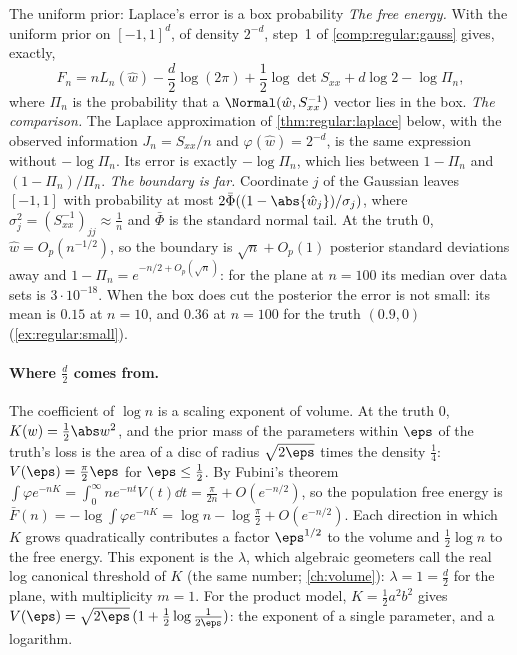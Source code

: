\begin{refsection}
\begin{computation}{The uniform prior: Laplace's error is a box probability}\label{comp:regular:box}
\step \emph{The free energy.} With the uniform prior on $[-1,1]^d$, of density $2^{-d}$, step~1 of \cref{comp:regular:gauss} gives, exactly,
\begin{equation}\label{eq:regular:Fbox}
F_n=nL_n(\hat w)-\frac d2\log(2\pi)+\frac12\log\det S_{xx}+d\log2-\log\Pi_n,
\end{equation}
where $\Pi_n$ is the probability that a $\Normal(\hat w,S_{xx}^{-1})$ vector lies in the box.
\step \emph{The comparison.} The Laplace approximation of \cref{thm:regular:laplace} below, with the observed information $J_n=S_{xx}/n$ and $\varphi(\hat w)=2^{-d}$, is the same expression without $-\log\Pi_n$. Its error is exactly $-\log\Pi_n$, which lies between $1-\Pi_n$ and $(1-\Pi_n)/\Pi_n$.
\step \emph{The boundary is far.} Coordinate $j$ of the Gaussian leaves $[-1,1]$ with probability at most $2\bar\Phi((1-\abs{\hat w_j})/\sigma_j)$, where $\sigma_j^2=(S_{xx}^{-1})_{jj}\approx\frac1n$ and $\bar\Phi$ is the standard normal tail. At the truth $0$, $\hat w=O_p(n^{-1/2})$, so the boundary is $\sqrt n+O_p(1)$ posterior standard deviations away and $1-\Pi_n=e^{-n/2+O_p(\sqrt n)}$: for the plane at $n=100$ its median over data sets is $3\cdot10^{-18}$. When the box does cut the posterior the error is not small: its mean is $0.15$ at $n=10$, and $0.36$ at $n=100$ for the truth $(0.9,0)$ (\cref{ex:regular:small}).
\end{computation}

\paragraph{Where $\frac d2$ comes from.} The coefficient of $\log n$ is a scaling exponent of volume. At the truth $0$, $K(w)=\frac12\abs w^2$, and the prior mass of the parameters within $\eps$ of the truth's loss is the area of a disc of radius $\sqrt{2\eps}$ times the density $\frac14$: $V(\eps)=\frac\pi2\eps$ for $\eps\le\frac12$. By Fubini's theorem $\int\varphi e^{-nK}=\int_0^\infty ne^{-nt}V(t)\dd t=\frac\pi{2n}+O(e^{-n/2})$, so the population free energy is $\bar F(n)=-\log\int\varphi e^{-nK}=\log n-\log\frac\pi2+O(e^{-n/2})$. Each direction in which $K$ grows quadratically contributes a factor $\eps^{1/2}$ to the volume and $\frac12\log n$ to the free energy. This exponent is the  $\lambda$, which algebraic geometers call the real log canonical threshold of $K$ (the same number; \cref{ch:volume}): $\lambda=1=\frac d2$ for the plane, with multiplicity $m=1$. For the product model, $K=\frac12a^2b^2$ gives $V(\eps)=\sqrt{2\eps}\,(1+\frac12\log\frac1{2\eps})$: the exponent of a single parameter, and a logarithm.


\end{refsection}
